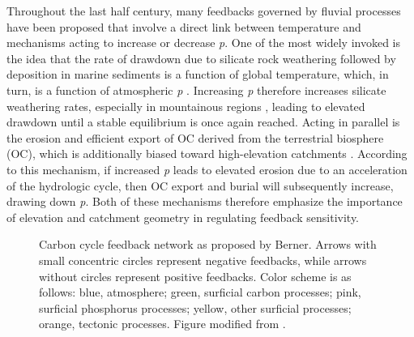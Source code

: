 Throughout the last half century, many feedbacks governed by fluvial processes have been proposed that involve a direct link between temperature and mechanisms acting to increase or decrease \textit{p}. One of the most widely invoked is the idea that the rate of  drawdown due to silicate rock weathering followed by  deposition in marine sediments is a function of global temperature, which, in turn, is a function of atmospheric \textit{p} \citep[\textit{e.g.}][]{Goldschmidt:1933tg,Rubey:1951ha,Walker:1981wn}. Increasing \textit{p} therefore increases silicate weathering rates, especially in mountainous regions \citep{Maher:2014kq}, leading to elevated  drawdown until a stable equilibrium is once again reached. Acting in parallel is the erosion and efficient export of OC derived from the terrestrial biosphere (OC), which is additionally biased toward high-elevation catchments \citep{FranceLanord:1997ua,Galy:2007ev,Hilton:2008fo,Galy:2015fx}. According to this mechanism, if increased \textit{p} leads to elevated erosion due to an acceleration of the hydrologic cycle, then OC export and burial will subsequently increase, drawing down \textit{p}. Both of these mechanisms therefore emphasize the importance of elevation and catchment geometry in regulating feedback sensitivity.

\begin{figure}[h]
	\caption[Carbon cycle feedback network \textit{a la} Berner]{Carbon cycle feedback network as proposed by Berner. Arrows with small concentric circles represent negative feedbacks, while arrows without circles represent positive feedbacks. Color scheme is as follows: blue, atmosphere; green, surficial carbon processes; pink, surficial phosphorus processes; yellow, other surficial processes; orange, tectonic processes. Figure modified from \citet{Berner:1999wj}.}
	\label{Ch7Fig:1}
\end{figure}

